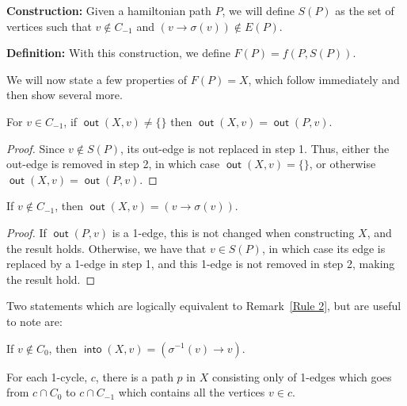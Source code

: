 \documentclass{article}
\DeclareMathOperator{\out}{\bm{\mathsf{out}}}
\DeclareMathOperator{\into}{\bm{\mathsf{into}}}
\newcommand{\dc}[1]{}%
\begin{document}
\vspace{1.75em}

\dc{amsthm}
\textbf{Construction:} Given a hamiltonian path $P$, we will define $S(P)$ as the set of vertices such that $v \not \in C_{-1}$ and $(v \to \sigma(v)) \not \in E(P)$. 

\textbf{Definition:} With this construction, we define $F(P) = f(P,S(P))$.

\vspace{1.75em}

We will now state a few properties of $F(P) = X$, which follow immediately and then show several more.\dc{ These properties will allow us to...}

\vspace{1.75em}

\begin{rmk} \label{Rule 1} For $v \in C_{-1}$, if $\out(X,v) \neq \{\}$ then $\out(X,v) = \out(P,v)$.\dc{ use ``tail''}
\begin{proof}
Since $v \not\in S(P)$, its out-edge is not replaced in step 1. Thus, either the out-edge is removed in step 2, in which case $\out(X,v) = \{\}$, or otherwise $\out(X,v) =\out(P,v)$.
\end{proof}
\end{rmk}

\begin{rmk} \label{Rule 2} If $v \not \in C_{-1}$, then $\out(X,v) = (v \to \sigma(v))$.  

\begin{proof} 
If $\out(P,v)$ is a 1-edge, this is not changed when constructing $X$, and the result holds. Otherwise, we have that $v \in S(P)$, in which case its edge is replaced by a 1-edge in step 1, and this 1-edge is not removed in step 2, making the result hold.
\end{proof}
\end{rmk}
Two statements which are logically equivalent to Remark~\ref{Rule 2}, but are useful to note are:

\begin{rmk} \label{Rule 2.5} If $v \not \in C_0$, then $\into(X,v) = (\sigma^{-1}(v)\to v)$.
\end{rmk}

\begin{rmk}\label{Rule 2.75} For each 1-cycle, $c$, there is a path $p$ in $X$ consisting only of 1-edges which goes from $c\cap C_0$ to $c \cap C_{-1}$ which contains all the vertices $v \in c$.
\end{rmk}
\end{document}
